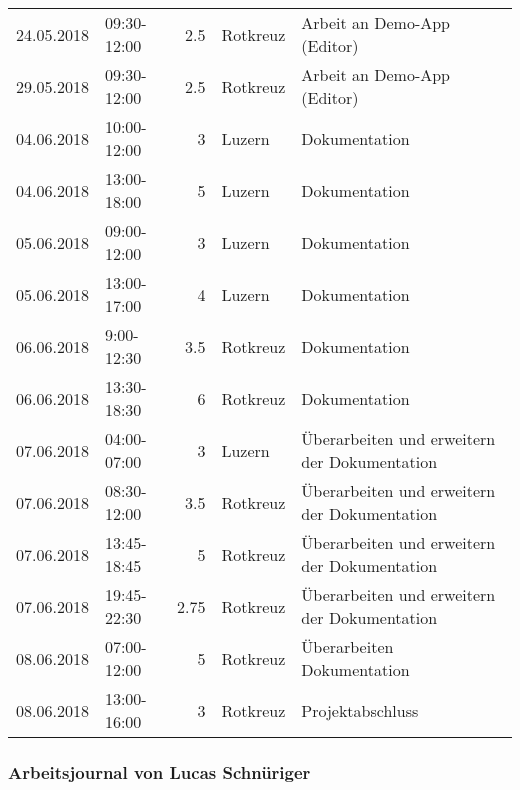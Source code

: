 \begin{longtable}{llrlp{7cm}}
	24.05.2018 & 09:30-12:00 & 2.5    & Rotkreuz & Arbeit an Demo-App (Editor) \\
	29.05.2018 & 09:30-12:00 & 2.5    & Rotkreuz & Arbeit an Demo-App (Editor) \\
	04.06.2018 & 10:00-12:00 & 3    & Luzern & Dokumentation \\
	04.06.2018 & 13:00-18:00 & 5    & Luzern & Dokumentation \\
	05.06.2018 & 09:00-12:00 & 3    & Luzern & Dokumentation \\
	05.06.2018 & 13:00-17:00 & 4    & Luzern & Dokumentation \\
	06.06.2018 & 9:00-12:30 & 3.5    & Rotkreuz & Dokumentation \\
	06.06.2018 & 13:30-18:30 & 6    & Rotkreuz & Dokumentation \\
	07.06.2018 & 04:00-07:00 & 3    & Luzern & Überarbeiten und erweitern der Dokumentation \\
	07.06.2018 & 08:30-12:00 & 3.5    & Rotkreuz & Überarbeiten und erweitern der Dokumentation \\
	07.06.2018 & 13:45-18:45 & 5    & Rotkreuz & Überarbeiten und erweitern der Dokumentation \\
	07.06.2018 & 19:45-22:30 & 2.75    & Rotkreuz & Überarbeiten und erweitern der Dokumentation \\
	08.06.2018 & 07:00-12:00 & 5    & Rotkreuz & Überarbeiten Dokumentation \\
	08.06.2018 & 13:00-16:00 & 3    & Rotkreuz & Projektabschluss \\
	\hline
\end{longtable}

\newpage
\subsubsection{Arbeitsjournal von Lucas Schnüriger}

